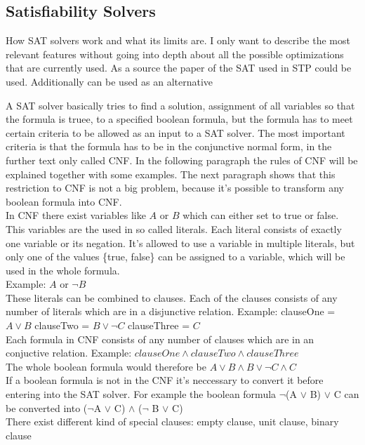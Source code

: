 \subsection{Satisfiability Solvers}
How SAT solvers work and what its limits are.
I only want to describe the most relevant features without going into depth about all the possible optimizations that are currently used.
As a source the paper of the SAT used in STP \cite{10.1007/978-3-540-24605-3_37} could be used. Additionally \cite{Gomes2008SatisfiabilityS} can be used as an alternative

A SAT solver basically tries to find a solution, assignment of all variables so that the formula is truee, to a specified boolean formula, but the formula has to meet certain criteria to be allowed as an input to a SAT solver. The most important criteria is that the formula has to be in the conjunctive normal form, in the further text only called CNF. In the following paragraph the rules of CNF will be explained together with some examples. The next paragraph shows that this restriction to CNF is not a big problem, because it's possible to transform any boolean formula into CNF\cite{Jackson:2004:CFC:2103144.2103160}.\\
In CNF there exist variables like $A$ or $B$ which can either set to true or false.
This variables are the used in so called literals. Each literal consists of exactly one variable or its negation. It's allowed to use a variable in multiple literals, but only one of the values \{true, false\} can be assigned to a variable, which will be used in the whole formula.\\
Example: $A$ or $\lnot B$\\
These literals can be combined to clauses. Each of the clauses consists of any number of literals which are in a disjunctive relation. 
Example: clauseOne = $A \lor B$ clauseTwo = $B \lor \lnot C$ clauseThree = $C$\\
Each formula in CNF consists of any number of clauses which are in an conjuctive relation. Example: $clauseOne \land clauseTwo \land clauseThree$\\
The whole boolean formula would therefore be $A \lor B \land B \lor \lnot C \land C$\\
If a boolean formula is not in the CNF it's neccessary to convert it before entering into the SAT solver. For example the boolean formula $\lnot$(A $\lor$ B) $\lor$ C can be converted into ($\lnot$A $\lor$ C) $\land$ ($\lnot$ B $\lor$ C)\\
There exist different kind of special clauses: empty clause, unit clause, binary clause
